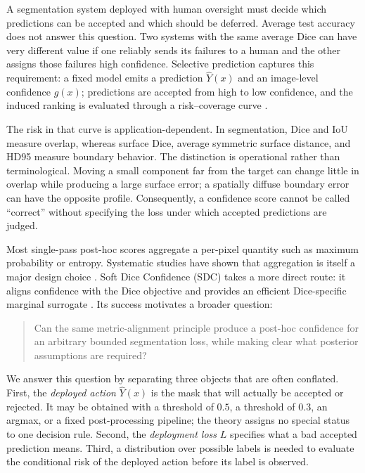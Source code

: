 A segmentation system deployed with human oversight must decide which predictions
can be accepted and which should be deferred. Average test accuracy does not answer
this question. Two systems with the same average Dice can have very different value
if one reliably sends its failures to a human and the other assigns those failures
high confidence. Selective prediction captures this requirement: a fixed model emits
a prediction $\widehat Y(x)$ and an image-level confidence $g(x)$; predictions are
accepted from high to low confidence, and the induced ranking is evaluated through a
risk--coverage curve \cite{selectivenet,feng,jaeger}.

The risk in that curve is application-dependent. In segmentation, Dice and IoU
measure overlap, whereas surface Dice, average symmetric surface distance, and
HD95 measure boundary behavior. The distinction is operational rather than
terminological. Moving a small component far from the target can change little in
overlap while producing a large surface error; a spatially diffuse boundary error can
have the opposite profile. Consequently, a confidence score cannot be called
``correct'' without specifying the loss under which accepted predictions are judged.

Most single-pass post-hoc scores aggregate a per-pixel quantity such as maximum
probability or entropy. Systematic studies have shown that aggregation is itself a
major design choice \cite{values,zenk}. Soft Dice Confidence (SDC) takes a more direct
route: it aligns confidence with the Dice objective and provides an efficient
Dice-specific marginal surrogate \cite{sdc}. Its success motivates a broader
question:

\begin{quote}
Can the same metric-alignment principle produce a post-hoc confidence for an
arbitrary bounded segmentation loss, while making clear what posterior assumptions are
required?
\end{quote}

We answer this question by separating three objects that are often conflated.
First, the \emph{deployed action} $\widehat Y(x)$ is the mask that will actually be
accepted or rejected. It may be obtained with a threshold of $0.5$, a threshold of
$0.3$, an argmax, or a fixed post-processing pipeline; the theory assigns no special
status to one decision rule. Second, the \emph{deployment loss} $L$ specifies what a
bad accepted prediction means. Third, a distribution over possible labels is needed
to evaluate the conditional risk of the deployed action before its label is observed.

